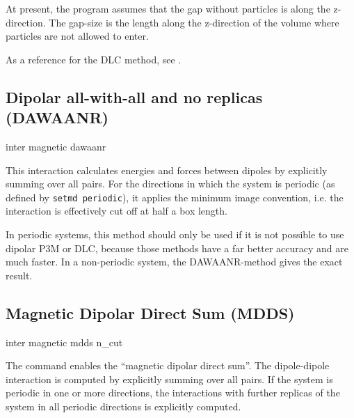 At present, the program assumes that the gap without particles is
along the z-direction.  The gap-size is the length along the
z-direction of the volume where particles are not allowed to enter.

As a reference for the DLC method, see \cite{brodka04a}.

\subsection{Dipolar all-with-all and no replicas (DAWAANR)}

\begin{essyntax}
  inter magnetic  dawaanr
  \begin{features}
  \end{features}
\end{essyntax}

This interaction calculates energies and forces between dipoles by
explicitly summing over all pairs.  For the directions in which the
system is periodic (as defined by \texttt{setmd periodic}), it applies
the minimum image convention, i.e. the interaction is effectively cut
off at half a box length.

In periodic systems, this method should only be used if it is not possible to use dipolar P3M or
DLC, because those methods have a far better accuracy and are much faster.
In a non-periodic system, the DAWAANR-method gives the exact result.

\subsection{Magnetic Dipolar Direct Sum (MDDS)}

\begin{essyntax}
  inter magnetic  mdds n\_cut 
  \begin{features}
  \end{features}
\end{essyntax}

The command enables the ``magnetic dipolar direct sum''.  The
dipole-dipole interaction is computed by explicitly summing over all
pairs. If the system is periodic in one or more directions, the
interactions with further  replicas of the system
in all periodic directions is explicitly computed.

